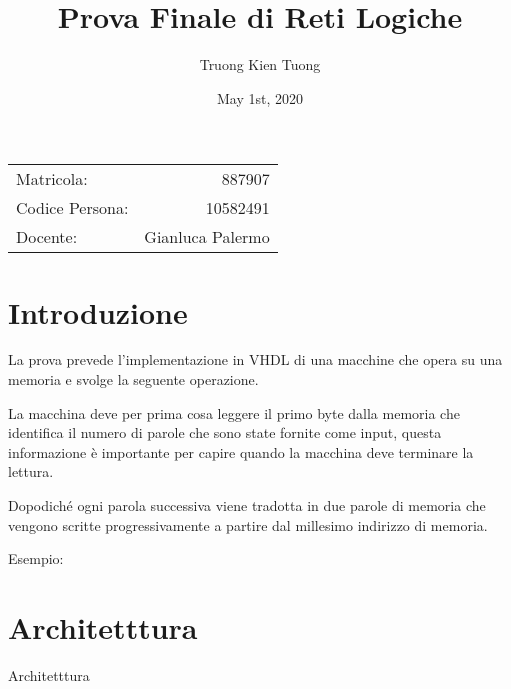 \documentclass{article}
\title{Prova Finale di Reti Logiche} %
\author{Truong Kien Tuong} %
\date{May 1st, 2020}
\begin{document}
\maketitle %
\begin{center}
\begin{tabular}{l r}
Matricola: & 887907\\ %
Codice Persona: & 10582491\\
Docente: & Gianluca Palermo %
\end{tabular}
\end{center}



\section{Introduzione}

La prova prevede l'implementazione in VHDL di una macchine che opera su una memoria e svolge la seguente operazione.

La macchina deve per prima cosa leggere il primo byte dalla memoria che identifica il numero di parole che sono
state fornite come input, questa informazione è importante per capire quando la macchina deve terminare la lettura.

Dopodiché ogni parola successiva viene tradotta in due parole di memoria che vengono scritte progressivamente a partire
dal millesimo indirizzo di memoria.

Esempio:




\section{Architetttura}
Architetttura



\end{document}

